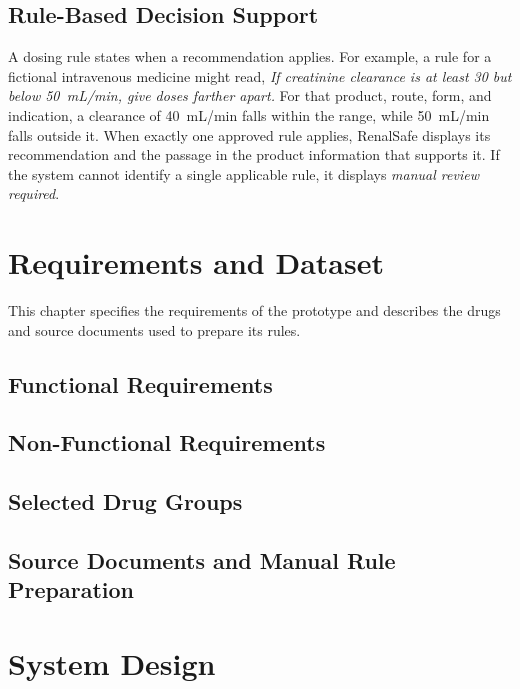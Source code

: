 \documentclass[12pt,a4paper,twoside]{book}
\begin{document}
\section{Rule-Based Decision Support}
\label{sec:rule-ai-decision-support}

A dosing rule states when a recommendation applies.
For example, a rule for a fictional intravenous medicine might read, \emph{If creatinine clearance is at least 30 but below 50~mL/min, give doses farther apart.}
For that product, route, form, and indication, a clearance of 40~mL/min falls within the range, while 50~mL/min falls outside it.
When exactly one approved rule applies, RenalSafe displays its recommendation and the passage in the product information that supports it.
If the system cannot identify a single applicable rule, it displays \emph{manual review required}.


\chapter{Requirements and Dataset}\label{ch:requirements}

This chapter specifies the requirements of the prototype and describes the drugs and source documents used to prepare its rules.

\section{Functional Requirements}\label{sec:functional-requirements}
\section{Non-Functional Requirements}\label{sec:non-functional-requirements}
\section{Selected Drug Groups}\label{sec:selected-drug-groups}
\section{Source Documents and Manual Rule Preparation}\label{sec:source-documents}


\chapter{System Design}\label{ch:design}
\end{document}
